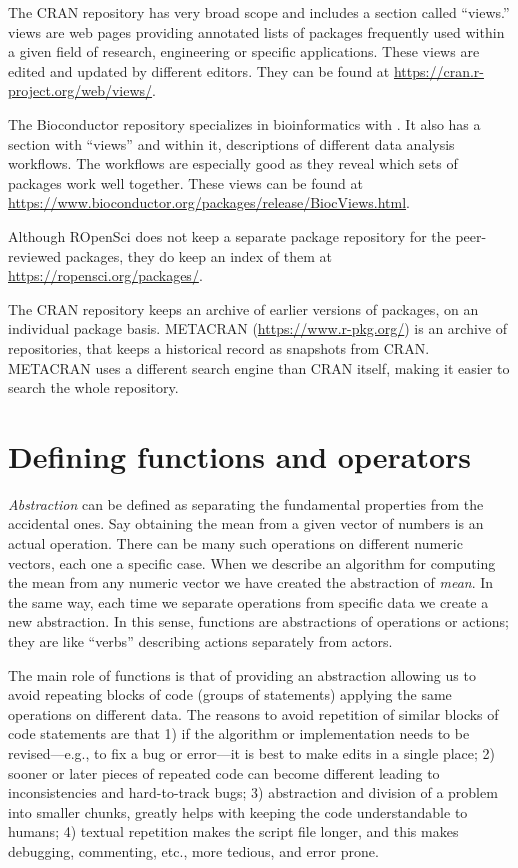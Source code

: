 \documentclass[krantz2]{krantz}\usepackage{knitr}
\begin{document}
The CRAN repository has very broad scope and includes a section called ``views.'' \Rlang views are web pages providing annotated lists of packages frequently used within a given field of research, engineering or specific applications. These views are edited and updated by different editors. They can be found at \url{https://cran.r-project.org/web/views/}.

The Bioconductor repository specializes in bioinformatics with \Rlang. It also has a section with ``views'' and within it, descriptions of different data analysis workflows. The workflows are especially good as they reveal which sets of packages work well together. These views can be found at \url{https://www.bioconductor.org/packages/release/BiocViews.html}.

Although ROpenSci does not keep a separate package repository for the peer-reviewed packages, they do keep an index of them at \url{https://ropensci.org/packages/}.

The CRAN repository keeps an archive of earlier versions of packages, on an individual package basis. METACRAN (\url{https://www.r-pkg.org/}) is an archive of repositories, that keeps a historical record as snapshots from CRAN. METACRAN uses a different search engine than CRAN itself, making it easier to search the whole repository.

\section{Defining functions and operators}\label{sec:script:functions}

\emph{Abstraction} can be defined as separating the fundamental properties from the accidental ones. Say obtaining the mean from a given vector of numbers is an actual operation. There can be many such operations on different numeric vectors, each one a specific case. When we describe an algorithm for computing the mean from any numeric vector we have created the abstraction of \emph{mean}. In the same way, each time we separate operations from specific data we create a new abstraction. In this sense, functions are abstractions of operations or actions; they are like ``verbs'' describing actions separately from actors.

The main role of functions is that of providing an abstraction allowing us to avoid repeating blocks of code (groups of statements) applying the same operations on different data. The reasons to avoid repetition of similar blocks of code statements are that 1) if the algorithm or implementation needs to be revised---e.g., to fix a bug or error---it is best to make edits in a single place; 2) sooner or later pieces of repeated code can become different leading to inconsistencies and hard-to-track bugs; 3) abstraction and division of a problem into smaller chunks, greatly helps with keeping the code understandable to humans; 4) textual repetition makes the script file longer, and this makes debugging, commenting, etc., more tedious, and error prone.
\end{document}
